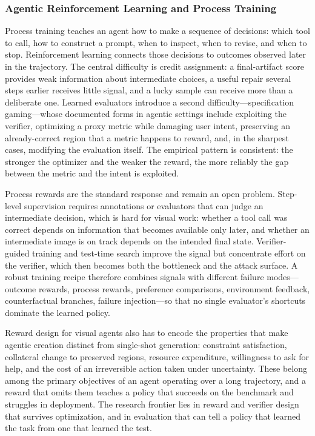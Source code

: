 \subsubsection{Agentic Reinforcement Learning and Process Training}

Process training teaches an agent how to make a sequence of decisions: which tool to call, how to construct a prompt, when to inspect, when to revise, and when to stop. Reinforcement learning connects those decisions to outcomes observed later in the trajectory. The central difficulty is credit assignment: a final-artifact score provides weak information about intermediate choices, a useful repair several steps earlier receives little signal, and a lucky sample can receive more than a deliberate one. Learned evaluators introduce a second difficulty---specification gaming---whose documented forms in agentic settings include exploiting the verifier, optimizing a proxy metric while damaging user intent, preserving an already-correct region that a metric happens to reward, and, in the sharpest cases, modifying the evaluation itself. The empirical pattern is consistent: the stronger the optimizer and the weaker the reward, the more reliably the gap between the metric and the intent is exploited.

Process rewards are the standard response and remain an open problem. Step-level supervision requires annotations or evaluators that can judge an intermediate decision, which is hard for visual work: whether a tool call was correct depends on information that becomes available only later, and whether an intermediate image is on track depends on the intended final state. Verifier-guided training and test-time search improve the signal but concentrate effort on the verifier, which then becomes both the bottleneck and the attack surface. A robust training recipe therefore combines signals with different failure modes---outcome rewards, process rewards, preference comparisons, environment feedback, counterfactual branches, failure injection---so that no single evaluator's shortcuts dominate the learned policy.

Reward design for visual agents also has to encode the properties that make agentic creation distinct from single-shot generation: constraint satisfaction, collateral change to preserved regions, resource expenditure, willingness to ask for help, and the cost of an irreversible action taken under uncertainty. These belong among the primary objectives of an agent operating over a long trajectory, and a reward that omits them teaches a policy that succeeds on the benchmark and struggles in deployment. The research frontier lies in reward and verifier design that survives optimization, and in evaluation that can tell a policy that learned the task from one that learned the test.

